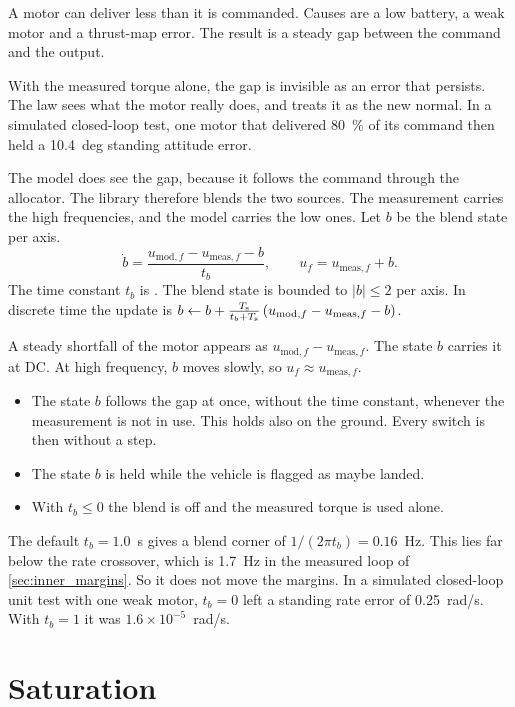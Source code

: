 A motor can deliver less than it is commanded.
Causes are a low battery, a weak motor and a thrust-map error.
The result is a steady gap between the command and the output.

With the measured torque alone, the gap is invisible as an error that persists.
The law sees what the motor really does, and treats it as the new normal.
In a simulated closed-loop test, one motor that delivered 80~\% of its command then held a 10.4~deg standing attitude error.

The model does see the gap, because it follows the command through the allocator.
The library therefore blends the two sources.
The measurement carries the high frequencies, and the model carries the low ones.
Let $b$ be the blend state per axis.
\begin{equation}\label{eq:inner_blend}
  \dot b = \frac{u_{\mathrm{mod},f} - u_{\mathrm{meas},f} - b}{t_b} ,
  \qquad u_f = u_{\mathrm{meas},f} + b .
\end{equation}
The time constant $t_b$ is .
The blend state is bounded to $|b|\le 2$ per axis.
In discrete time the update is $b \leftarrow b + \tfrac{T_{\mathrm{s}}}{t_b+T_{\mathrm{s}}}\,(u_{\mathrm{mod},f}-u_{\mathrm{meas},f}-b)$.

A steady shortfall of the motor appears as $u_{\mathrm{mod},f}-u_{\mathrm{meas},f}$.
The state $b$ carries it at DC.
At high frequency, $b$ moves slowly, so $u_f\approx u_{\mathrm{meas},f}$.

\begin{itemize}
  \item The state $b$ follows the gap at once, without the time constant, whenever the measurement is not in use.
    This holds also on the ground.
    Every switch is then without a step.
  \item The state $b$ is held while the vehicle is flagged as maybe landed.
  \item With $t_b\le 0$ the blend is off and the measured torque is used alone.
\end{itemize}

The default $t_b=1.0$~s gives a blend corner of $1/(2\pi t_b)=0.16$~Hz.
This lies far below the rate crossover, which is 1.7~Hz in the measured loop of \cref{sec:inner_margins}.
So it does not move the margins.
In a simulated closed-loop unit test with one weak motor, $t_b=0$ left a standing rate error of 0.25~rad/s.
With $t_b=1$ it was $1.6\times10^{-5}$~rad/s.

\section{Saturation}\label{sec:inner_sat}

